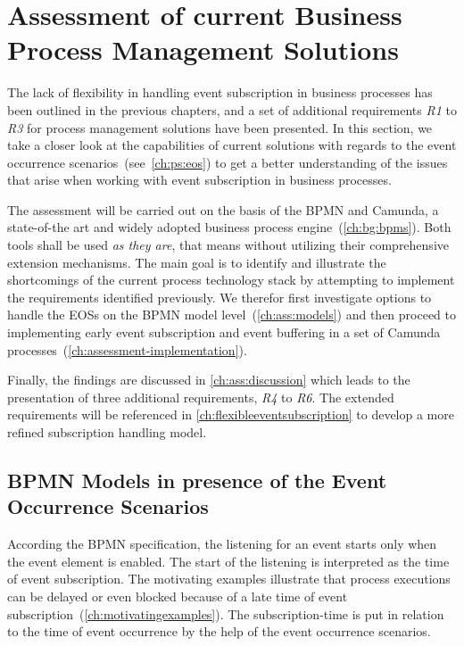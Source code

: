 \chapter{Assessment of current Business Process Management Solutions}\label{ch:assessment}

The lack of flexibility in handling event subscription in business processes has been outlined in the previous chapters, and a set of additional requirements \textit{R1} to \textit{R3} for process management solutions have been presented.
In this section, we take a closer look at the capabilities of current solutions with regards to the event occurrence scenarios~(see~\autoref{ch:ps:eos}) to get a better understanding of the issues that arise when working with event subscription in business processes.

The assessment will be carried out on the basis of the \ac{BPMN} and Camunda, a state-of-the art and widely adopted business process engine~(\autoref{ch:bg:bpms}). Both tools shall be used \textit{as they are}, that means without utilizing their comprehensive extension mechanisms.
The main goal is to identify and illustrate the shortcomings of the current process technology stack by attempting to implement the requirements identified previously.
We therefor first investigate options to handle the \acs{EOS}s on the BPMN model level~(\autoref{ch:ass:models}) and then proceed to implementing early event subscription and event buffering in a set of Camunda processes~(\autoref{ch:assessment-implementation}).

Finally, the findings are discussed in \autoref{ch:ass:discussion} which leads to the presentation of three additional requirements, \textit{R4} to \textit{R6}.
The extended requirements will be referenced in \autoref{ch:flexibleeventsubscription} to develop a more refined subscription handling model.


\section{BPMN Models in presence of the Event Occurrence Scenarios}\label{ch:ass:models}

According the BPMN specification, the listening for an event starts only when the event element is enabled. The start of the listening is interpreted as the time of event subscription.
The motivating examples illustrate that process executions can be delayed or even blocked because of a late time of event subscription~(\autoref{ch:motivatingexamples}).
The subscription-time is put in relation to the time of event occurrence by the help of the event occurrence scenarios.

